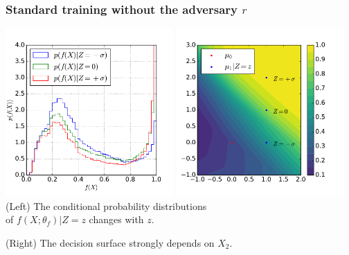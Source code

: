 \documentclass{beamer}
\begin{document}
\begin{frame}
    \frametitle{Standard training without the adversary $r$}

    \begin{center}
        \includegraphics[width=0.48\textwidth]{figures/f-plain.pdf}
        \includegraphics[width=0.48\textwidth]{figures/surface-plain.pdf}\\
        (Left) The conditional probability distributions \\
        of $f(X;\theta_f)|Z=z$ {\color{red}changes with $z$}.

        \vspace{0.25cm}

        (Right) The decision surface {\color{red} strongly depends on $X_2$}.
    \end{center}
\end{frame}
\end{document}
